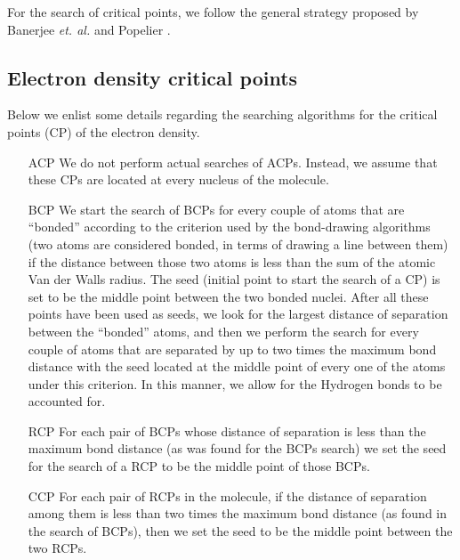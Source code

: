 For the search of critical points, we follow the general strategy proposed by Banerjee \textit{et. al.} \cite{bib:banerjee1985} and Popelier \cite{bib:popelier1994}.

\subsection{Electron density critical points}

Below we enlist some details regarding the searching algorithms for the critical points (CP) of the electron density.

\begin{itemize}
\item[ACP] We do not perform actual searches of ACPs.  Instead, we assume that these CPs are located at every nucleus of the molecule.
\item[BCP] We start the search of BCPs for every couple of atoms that are ``bonded'' according to the criterion used by the bond-drawing algorithms (two atoms are considered bonded, in terms of drawing a line between them) if the distance between those two atoms is less than the sum of the atomic Van der Walls radius. The seed (initial point to start the search of a CP) is set to be the middle point between the two bonded nuclei. After all these points have been used as seeds, we look for the largest distance of separation between the ``bonded'' atoms, and then we perform the search for every couple of atoms that are separated by up to two times the maximum bond distance with the seed located at the middle point of every one of the atoms under this criterion. In this manner, we allow for the Hydrogen bonds to be accounted for.
\item[RCP] For each pair of BCPs whose distance of separation is less than the maximum bond distance (as was found for the BCPs search) we set the seed for the search of a RCP to be the middle point of those BCPs.
\item[CCP] For each pair of RCPs in the molecule, if the distance of separation among them is less than two times the maximum bond distance (as found in the search of BCPs), then we set the seed to be the middle point between the two RCPs.
\end{itemize}

